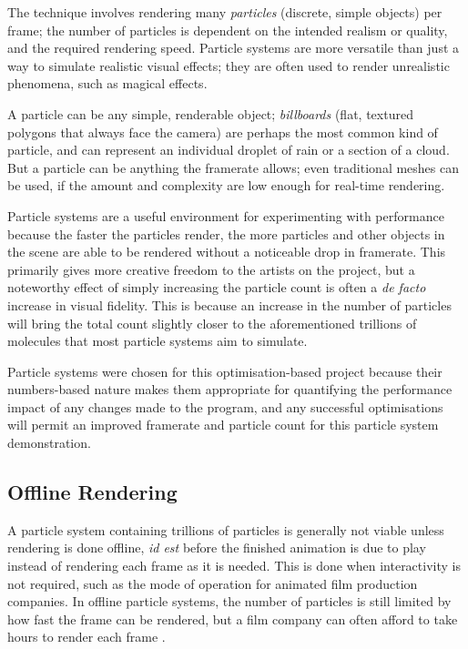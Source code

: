 \documentclass[11pt, a4paper, twocolumn]{article}
\begin{document}
The technique involves rendering many \emph{particles} (discrete, simple objects) per frame; the number of particles is dependent on the intended realism or quality, and the required rendering speed. Particle systems are more versatile than just a way to simulate realistic visual effects; they are often used to render unrealistic phenomena, such as magical effects.

A particle can be any simple, renderable object; \emph{billboards} (flat, textured polygons that always face the camera) are perhaps the most common kind of particle, and can represent an individual droplet of rain or a section of a cloud. But a particle can be anything the framerate allows; even traditional meshes can be used, if the amount and complexity are low enough for real-time rendering.

Particle systems are a useful environment for experimenting with performance because the faster the particles render, the more particles and other objects in the scene are able to be rendered without a noticeable drop in framerate. This primarily gives more creative freedom to the artists on the project, but a noteworthy effect of simply increasing the particle count is often a \emph{de facto} increase in visual fidelity. This is because an increase in the number of particles will bring the total count slightly closer to the aforementioned trillions of molecules that most particle systems aim to simulate.

Particle systems were chosen for this optimisation-based project because their numbers-based nature makes them appropriate for quantifying the performance impact of any changes made to the program, and any successful optimisations will permit an improved framerate and particle count for this particle system demonstration.

\subsection{Offline Rendering}

A particle system containing trillions of particles is generally not viable unless rendering is done offline, \emph{id est} before the finished animation is due to play instead of rendering each frame as it is needed. This is done when interactivity is not required, such as the mode of operation for animated film production companies. In offline particle systems, the number of particles is still limited by how fast the frame can be rendered, but a film company can often afford to take hours to render each frame \citep{Cook1987}.
\end{document}
